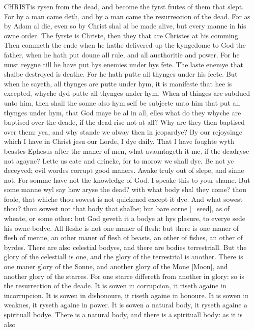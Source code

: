 CHRIST\textbf{}is rysen from the dead, and become the fyrst frutes of them that slept.
For by a man came deth, and by a man came the resurreccion of the dead.
For as by Adam al die, even so by Christ shal al be made alive, but every
manne in his owne order. The fyrste is Christe, then they that are Christes
at his comming. Then commeth the ende when he hathe delivered up the kyngedome
to God the father, when he hath put doune all rule, and all aucthoritie
and power. For he must reygne till he have put hys enemies under hys fete.
The laste enemye that shalbe destroyed is deathe. For he hath putte all
thynges under his feete. But when he sayeth, all thynges are putte under
hym, it is manifeste that hee is excepted, whyche dyd putte all thynges
under hym. When al thinges are subdued unto him, then shall the sonne
also hym self be subjecte unto him that put all thynges under hym, that
God maye be al in all, elles what do they whyche are baptised over the
deade, if the dead rise not at all? Why are they then baptised over them:
yea, and why stande we alway then in jeopardye? By our rejoysinge which
I have in Christ jesu our Lorde, I dye daily. That I have foughte wyth
beastes Ephesus after the maner of men, what avauntageth it me, if the
dead\textbf{}ryse not agayne? Lette us eate and drincke, for to morow we
shall dye. Be not ye deceyved; evil wordes corrupt good maners. Awake
truly out of slepe, and sinne not. For somme have not the knowledge of
God. I speake this to your shame. But some manne wyl say how aryse the
dead? with what body shal they come? thou foole, that whiche thou sowest
is not quickened except it dye. And what sowest thou? thou sowest not
that body that shalbe; but bare corne [=seed],
as of wheate, or some other: but God geveth it a bodye at hys plesure,
to everye sede his owne bodye. All fleshe is not one maner of flesh: but
there is one maner of flesh of menne, an other maner of flesh of beasts,
an other of fishes, an other of byrdes. There are also celestial bodyes,
and there are bodies terrestriall. But the glory of the celestiall is
one, and the glory of the terrestrial is another. There is one maner glory
of the Sonne, and another glory of the Mone
[Moon], and another glory of the starres. For one starre differeth
from another in glory: so is the resurrection of the deade. It is sowen
in corrupcion, it riseth againe in incorrupcion. It is sowen in dishonoure,
it riseth againe in honoure. It is sowen in weaknes, it ryseth againe
in power. It is sowen a natural body, it ryseth againe a spirituall bodye.
There is a natural body, and there is a spirituall body: as it is also
